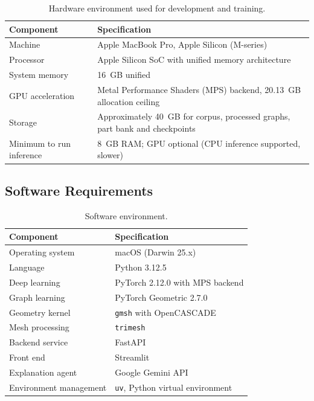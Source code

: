 \documentclass[12pt,oneside,a4paper]{report}
\begin{document}
\begin{table}[h]
\centering
\caption{Hardware environment used for development and training.}
\label{tab:hwreq}
\small
\begin{tabularx}{\textwidth}{@{}L{4.2cm}X@{}}
\toprule
\textbf{Component} & \textbf{Specification} \\
\midrule
Machine & Apple MacBook Pro, Apple Silicon (M-series) \\
Processor & Apple Silicon SoC with unified memory architecture \\
System memory & 16~GB unified \\
GPU acceleration & Metal Performance Shaders (MPS) backend, 20.13~GB allocation ceiling \\
Storage & Approximately 40~GB for corpus, processed graphs, part bank and checkpoints \\
Minimum to run inference & 8~GB RAM; GPU optional (CPU inference supported, slower) \\
\bottomrule
\end{tabularx}
\end{table}

\subsection{Software Requirements}

\begin{table}[h]
\centering
\caption{Software environment.}
\label{tab:swreq}
\small
\begin{tabularx}{\textwidth}{@{}L{4.2cm}X@{}}
\toprule
\textbf{Component} & \textbf{Specification} \\
\midrule
Operating system & macOS (Darwin 25.x) \\
Language & Python 3.12.5 \\
Deep learning & PyTorch 2.12.0 with MPS backend \\
Graph learning & PyTorch Geometric 2.7.0~\cite{fey2019pyg} \\
Geometry kernel & \texttt{gmsh} with OpenCASCADE \\
Mesh processing & \texttt{trimesh} \\
Backend service & FastAPI \\
Front end & Streamlit \\
Explanation agent & Google Gemini API \\
Environment management & \texttt{uv}, Python virtual environment \\
\bottomrule
\end{tabularx}
\end{table}
\end{document}
